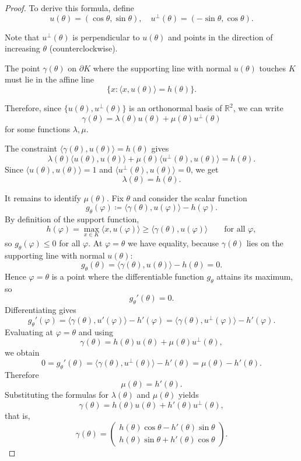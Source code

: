\documentclass[11pt,letterpaper,reqno]{amsart}
\newcommand{\R}{\mathbb{R}}
\newcommand{\inner}[2]{\langle #1,#2\rangle}
\providecommand{\R}{\mathbb{R}}
\begin{document}
\begin{explanation}
\begin{proof}
To derive this formula, define
\[
u(\theta) = (\cos\theta,\sin\theta), \quad
u^\perp(\theta) = (-\sin\theta,\cos\theta).
\]

Note that $u^\perp(\theta)$ is perpendicular to $u(\theta)$ and points in the direction of increasing $\theta$ (counterclockwise).

The point $\gamma(\theta)$ on $\partial K$ where the supporting line with normal $u(\theta)$ touches $K$ must lie in the affine line
\[
\{ x : \langle x,u(\theta)\rangle = h(\theta)\}.
\]

Therefore, since $\{u(\theta),u^\perp(\theta)\}$ is an orthonormal basis of $\R^2$, we can write
\[
\gamma(\theta)=\lambda(\theta) u(\theta)+\mu(\theta) u^\perp(\theta)
\]
for some functions $\lambda,\mu$.

The constraint $\inner{\gamma(\theta)}{u(\theta)}=h(\theta)$ gives
\[
\lambda(\theta)\inner{u(\theta)}{u(\theta)}+\mu(\theta)\inner{u^\perp(\theta)}{u(\theta)}=h(\theta).
\]
Since $\inner{u(\theta)}{u(\theta)}=1$ and $\inner{u^\perp(\theta)}{u(\theta)}=0$, we get
\[
\lambda(\theta)=h(\theta).
\]

It remains to identify $\mu(\theta)$. Fix $\theta$ and consider the scalar function
\[
g_\theta(\varphi)\coloneqq \inner{\gamma(\theta)}{u(\varphi)}-h(\varphi).
\]
By definition of the support function,
\[
h(\varphi)=\max_{x\in K}\inner{x}{u(\varphi)}\ge \inner{\gamma(\theta)}{u(\varphi)}
\qquad\text{for all }\varphi,
\]
so $g_\theta(\varphi)\le 0$ for all $\varphi$. At $\varphi=\theta$ we have equality, because $\gamma(\theta)$ lies on the supporting line with normal $u(\theta)$:
\[
g_\theta(\theta)=\inner{\gamma(\theta)}{u(\theta)}-h(\theta)=0.
\]
Hence $\varphi=\theta$ is a point where the differentiable function $g_\theta$ attains its maximum, so
\[
g_\theta'(\theta)=0.
\]
Differentiating gives
\[
g_\theta'(\varphi)=\inner{\gamma(\theta)}{u'(\varphi)}-h'(\varphi)
=\inner{\gamma(\theta)}{u^\perp(\varphi)}-h'(\varphi).
\]
Evaluating at $\varphi=\theta$ and using
\[
\gamma(\theta)=h(\theta)u(\theta)+\mu(\theta)u^\perp(\theta),
\]
we obtain
\[
0=g_\theta'(\theta)=\inner{\gamma(\theta)}{u^\perp(\theta)}-h'(\theta)=\mu(\theta)-h'(\theta).
\]
Therefore
\[
\mu(\theta)=h'(\theta).
\]
Substituting the formulas for $\lambda(\theta)$ and $\mu(\theta)$ yields
\[
\gamma(\theta)=h(\theta)u(\theta)+h'(\theta)u^\perp(\theta),
\]
that is,
\[
\gamma(\theta)
=
\begin{pmatrix}
h(\theta)\cos\theta-h'(\theta)\sin\theta\\
h(\theta)\sin\theta+h'(\theta)\cos\theta
\end{pmatrix}.
\]

\end{proof}
\end{explanation}
\end{document}
